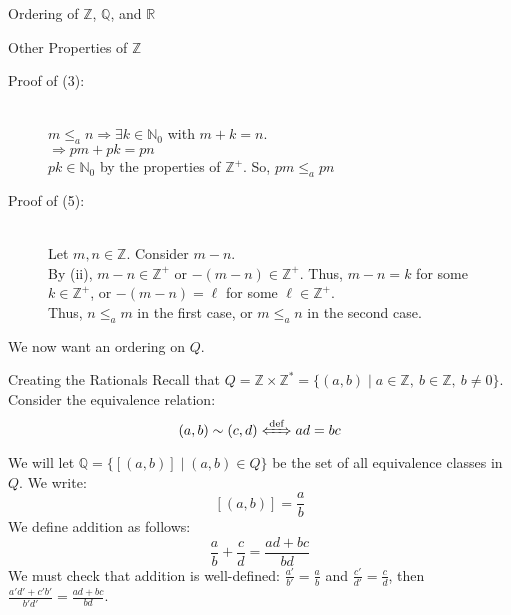 \documentclass[10pt]{extarticle}
\newcommand{\N}{\mathbb{N}}
\newcommand{\Q}{\mathbb{Q}}
\newcommand{\Z}{\mathbb{Z}}
\newcommand{\R}{\mathbb{R}}
\begin{document}
\begin{problem}{Ordering of $\Z$, $\Q$, and $\R$}
\begin{problem}{Other Properties of $\Z$}
\begin{enumerate}[(\arabic*)]
      \end{enumerate}
      \tcblower
      \begin{description}
        \item[Proof of (3):]\hfill\\
          $m\leq_a n \Rightarrow \exists k\in \N_0$ with $m+k = n$.\\
          $\Rightarrow pm + pk = pn$\\
          $pk\in \N_0$ by the properties of $\Z^+$. So, $pm \leq_a pn$
        \item[Proof of (5):]\hfill\\
          Let $m,n\in\Z$. Consider $m-n$.\\
          By (ii), $m-n\in\Z^+$ or $-(m-n)\in\Z^+$. Thus, $m-n = k$ for some $k\in\Z^+$, or $-(m-n) = \ell$ for some $\ell\in\Z^+$.\\
          Thus, $n\leq_a m$ in the first case, or $m\leq_a n$ in the second case.
      \end{description}
    \end{problem}
    We now want an ordering on $Q$.
    \begin{problem}{Creating the Rationals}
      Recall that $Q = \Z \times \Z^* = \{(a,b) \mid a\in \Z,~b\in \Z,~b\neq 0\}$. Consider the equivalence relation:
      \[
        (a,b)\sim(c,d) \xLeftrightarrow{\text{def}} ad = bc
      \] 
      We will let $\Q = \{[(a,b)]\mid (a,b) \in Q\}$ be the set of all equivalence classes in $Q$. We write:
      \[
        [(a,b)] = \frac{a}{b}
      \] 
      We define addition as follows:
      \[
        \frac{a}{b} + \frac{c}{d} = \frac{ad + bc}{bd}
      \] 
      We must check that addition is well-defined: $\frac{a'}{b'} = \frac{a}{b}$ and $\frac{c'}{d'} = \frac{c}{d}$, then $\frac{a'd' + c'b'}{b'd'} = \frac{ad+bc}{bd}$.\\


\end{problem}
\end{problem}
\end{document}
